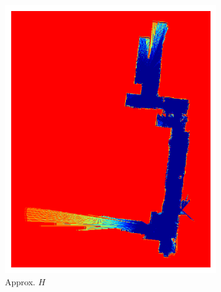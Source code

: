 \documentclass[11pt,professionalfonts,hyperref={pdftex,pdfpagemode=none,pdfstartview=FitH}]{beamer}
\begin{document}
\begin{frame}
\begin{figure}[!htbp]
\begin{subfigure}{0.2\textwidth}
        \includegraphics[width=\textwidth]{AISM_Image_inf_19.pdf}
        \caption*{Approx. $H$}
    \end{subfigure}
    \begin{subfigure}{0.2\textwidth}
        \centering

\end{subfigure}
\end{figure}
\end{frame}
\end{document}
